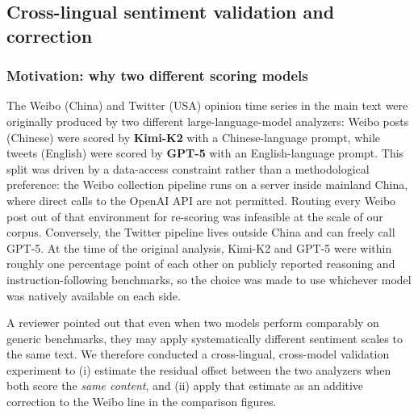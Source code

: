 %
%

\subsection{Cross-lingual sentiment validation and correction}
\label{si:cross-lingual}

\subsubsection{Motivation: why two different scoring models}

The Weibo (China) and Twitter (USA) opinion time series in the main text
were originally produced by two different large-language-model analyzers:
Weibo posts (Chinese) were scored by \textbf{Kimi-K2} with a
Chinese-language prompt, while tweets (English) were scored by
\textbf{GPT-5} with an English-language prompt. This split was driven by a
data-access constraint rather than a methodological preference: the Weibo
collection pipeline runs on a server inside mainland China, where direct
calls to the OpenAI API are not permitted. Routing every Weibo post out of
that environment for re-scoring was infeasible at the scale of our
corpus. Conversely, the Twitter pipeline lives outside China and can
freely call GPT-5. At the time of the original analysis, Kimi-K2 and
GPT-5 were within roughly one percentage point of each other on
publicly reported reasoning and instruction-following benchmarks, so the
choice was made to use whichever model was natively available on each
side.

A reviewer pointed out that even when two models perform comparably on
generic benchmarks, they may apply systematically different sentiment
scales to the same text. We therefore conducted a cross-lingual,
cross-model validation experiment to (i) estimate the residual offset
between the two analyzers when both score the \emph{same content}, and
(ii) apply that estimate as an additive correction to the Weibo line in
the comparison figures.

